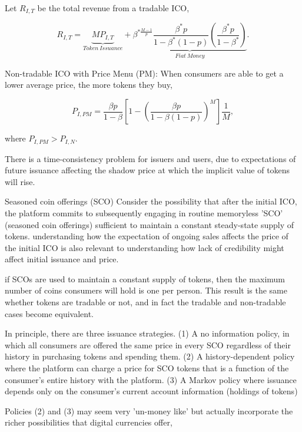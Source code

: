 Let $R_{I,T}$ be the total revenue from a tradable ICO,

\begin{equation}
    R_{I,T} = \underbrace{M P_{I,T}}_{Token~Issuance}
    +
    \underbrace{\beta^{*\frac{M-1}{p}}\frac{\beta^{*}p}{1-\beta^{*}(1-p)}\left(\frac{\beta^{*}p}{1-\beta^{*}}\right)}_{Fiat~Money}.
\end{equation}

Non-tradable ICO with Price Menu (PM): When consumers are able to get a lower average price, the more tokens they buy,

\begin{equation}
    P_{I,PM} = \frac{\beta p}{1-\beta}[1-\left(\frac{\beta p}{1-\beta(1-p)}\right)^{M}]\frac{1}{M},
\end{equation}

where $P_{I,PM} > P_{I,N}$.

There is a time-consistency problem for issuers and users, due to expectations of future issuance affecting the shadow price at which the implicit value of tokens will rise. 

Seasoned coin offerings (SCO) Consider the possibility that
after the initial ICO, the platform commits to subsequently engaging in routine memoryless 'SCO' (seasoned coin offerings) sufficient to maintain a constant steady-state supply of tokens. understanding how the expectation of ongoing sales affects the price of the initial ICO is also relevant to understanding how lack of credibility might affect initial issuance and price.  

if SCOs are used to maintain a constant supply of tokens, then the maximum number of coins consumers will hold is one per person. This result is the same whether tokens are tradable or not, and in fact the tradable and non-tradable cases become equivalent.

In principle, there are three issuance strategies. (1) A no information policy, in which all consumers are offered the same price in every SCO regardless of their history in purchasing tokens and spending them. (2) A history-dependent policy where the platform can charge a price for SCO tokens that is a function of the consumer's entire history with the platform. (3) A Markov policy where issuance depends only on the consumer's current account information (holdings of tokens)

Policies (2) and (3) may seem very 'un-money like' but actually incorporate the richer possibilities that digital currencies offer,


